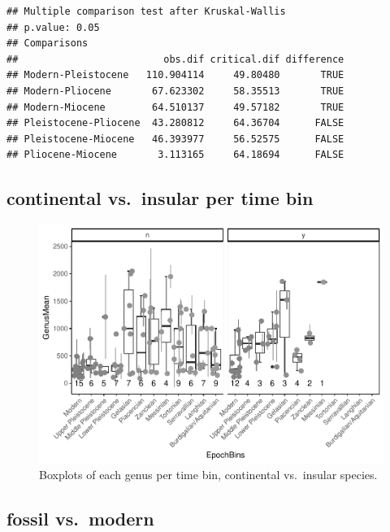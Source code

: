 \documentclass[]{article}
\begin{document}
\begin{verbatim}
## Multiple comparison test after Kruskal-Wallis 
## p.value: 0.05 
## Comparisons
##                         obs.dif critical.dif difference
## Modern-Pleistocene   110.904114     49.80480       TRUE
## Modern-Pliocene       67.623302     58.35513       TRUE
## Modern-Miocene        64.510137     49.57182       TRUE
## Pleistocene-Pliocene  43.280812     64.36704      FALSE
## Pleistocene-Miocene   46.393977     56.52575      FALSE
## Pliocene-Miocene       3.113165     64.18694      FALSE
\end{verbatim}

\newpage

\subsection{continental vs.~insular per time
bin}\label{continental-vs.insular-per-time-bin}

\begin{figure}[htbp]
\centering
\includegraphics{MA_JJ_files/figure-latex/BPGBinsCI-1.pdf}
\caption{Boxplots of each genus per time bin, continental vs.~insular
species.}
\end{figure}

\newpage

\subsection{fossil vs.~modern}\label{fossil-vs.modern}
\end{document}
